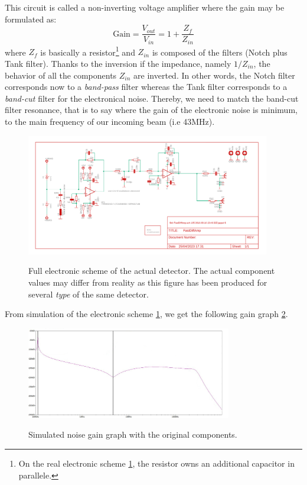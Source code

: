 \documentclass[11pt]{report}
\begin{document}
This circuit is called a non-inverting voltage amplifier where the gain may be formulated as:
\begin{equation}
\textrm{Gain} = \frac{V_{out}}{V_{in}} = 1 + \frac{Z_{f}}{Z_{in}}
\end{equation}
where $Z_f$ is basically a resistor\footnote{On the real electronic scheme \ref{fig:elec-scheme}, the resistor owns an additional capacitor in parallele.} and $Z_{in}$ is composed of the filters (Notch plus Tank filter). Thanks to the inversion if the impedance, namely $1/Z_{in}$, the behavior of all the components $Z_{in}$ are inverted. In other words, the Notch filter corresponds now to a \textit{band-pass} filter whereas the Tank filter corresponds to a \textit{band-cut} filter for the electronical noise. Thereby, we need to match the band-cut filter resonance, that is to say where the gain of the electronic noise is minimum, to the main frequency of our incoming beam (i.e 43MHz).

\begin{figure}[h!]
\caption{Full electronic scheme of the actual detector. The actual component values may differ from reality as this figure has been produced for several \textit{type} of the same detector.}
\centering
\includegraphics[width=0.95\textwidth]{elec-scheme}
\label{fig:elec-scheme}
\end{figure}

From simulation of the electronic scheme \ref{fig:elec-scheme}, we get the following gain graph \ref{fig:noise_gain_opamp_original}. 

\begin{figure}[h!]
\caption{Simulated noise gain graph with the original components.}
\centering
\includegraphics[width=0.8\textwidth]{noise_gain_opamp_original}
\label{fig:noise_gain_opamp_original}
\end{figure}
\end{document}

